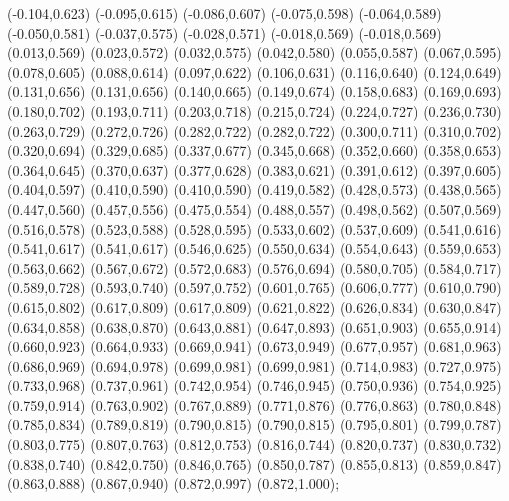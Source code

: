 {{		(-0.104,0.623) (-0.095,0.615) (-0.086,0.607) (-0.075,0.598) (-0.064,0.589) (-0.050,0.581)
		(-0.037,0.575) (-0.028,0.571) (-0.018,0.569) (-0.018,0.569) (0.013,0.569) (0.023,0.572)
		(0.032,0.575) (0.042,0.580) (0.055,0.587) (0.067,0.595) (0.078,0.605) (0.088,0.614)
		(0.097,0.622) (0.106,0.631) (0.116,0.640) (0.124,0.649) (0.131,0.656) (0.131,0.656)
		(0.140,0.665) (0.149,0.674) (0.158,0.683) (0.169,0.693) (0.180,0.702) (0.193,0.711)
		(0.203,0.718) (0.215,0.724) (0.224,0.727) (0.236,0.730) (0.263,0.729) (0.272,0.726)
		(0.282,0.722) (0.282,0.722) (0.300,0.711) (0.310,0.702) (0.320,0.694) (0.329,0.685)
		(0.337,0.677) (0.345,0.668) (0.352,0.660) (0.358,0.653) (0.364,0.645) (0.370,0.637)
		(0.377,0.628) (0.383,0.621) (0.391,0.612) (0.397,0.605) (0.404,0.597) (0.410,0.590)
		(0.410,0.590) (0.419,0.582) (0.428,0.573) (0.438,0.565) (0.447,0.560) (0.457,0.556)
		(0.475,0.554) (0.488,0.557) (0.498,0.562) (0.507,0.569) (0.516,0.578) (0.523,0.588)
		(0.528,0.595) (0.533,0.602) (0.537,0.609) (0.541,0.616) (0.541,0.617) (0.541,0.617)
		(0.546,0.625) (0.550,0.634) (0.554,0.643) (0.559,0.653) (0.563,0.662) (0.567,0.672)
		(0.572,0.683) (0.576,0.694) (0.580,0.705) (0.584,0.717) (0.589,0.728) (0.593,0.740)
		(0.597,0.752) (0.601,0.765) (0.606,0.777) (0.610,0.790) (0.615,0.802) (0.617,0.809)
		(0.617,0.809) (0.621,0.822) (0.626,0.834) (0.630,0.847) (0.634,0.858) (0.638,0.870)
		(0.643,0.881) (0.647,0.893) (0.651,0.903) (0.655,0.914) (0.660,0.923) (0.664,0.933)
		(0.669,0.941) (0.673,0.949) (0.677,0.957) (0.681,0.963) (0.686,0.969) (0.694,0.978)
		(0.699,0.981) (0.699,0.981) (0.714,0.983) (0.727,0.975) (0.733,0.968) (0.737,0.961)
		(0.742,0.954) (0.746,0.945) (0.750,0.936) (0.754,0.925) (0.759,0.914) (0.763,0.902)
		(0.767,0.889) (0.771,0.876) (0.776,0.863) (0.780,0.848) (0.785,0.834) (0.789,0.819)
		(0.790,0.815) (0.790,0.815) (0.795,0.801) (0.799,0.787) (0.803,0.775) (0.807,0.763)
		(0.812,0.753) (0.816,0.744) (0.820,0.737) (0.830,0.732) (0.838,0.740) (0.842,0.750)
		(0.846,0.765) (0.850,0.787) (0.855,0.813) (0.859,0.847) (0.863,0.888) (0.867,0.940)
		(0.872,0.997) (0.872,1.000)};}
\newcommand{\ovfFiftyData}{\addplot[ovfdata] coordinates {
		(-0.930,0.089) (-0.740,0.493) (-0.581,0.535) (-0.526,0.409) (-0.289,0.690) (-0.262,0.720)
		(-0.186,0.729) (-0.143,0.687) (-0.138,0.670) (0.173,0.586) (0.295,0.807) (0.465,0.589)
		(0.536,0.716) (0.768,0.695) (0.773,0.681)};}
